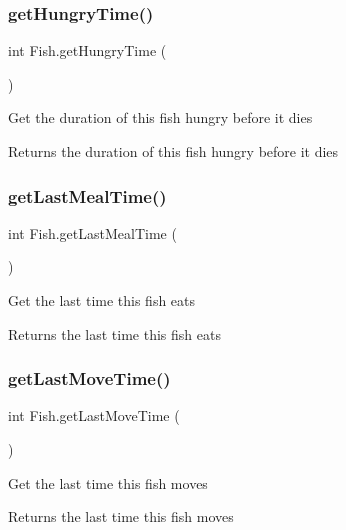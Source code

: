 \subsubsection{\texorpdfstring{get\+Hungry\+Time()}{getHungryTime()}}
{\footnotesize\ttfamily int Fish.\+get\+Hungry\+Time (\begin{DoxyParamCaption}{ }\end{DoxyParamCaption})\hspace{0.3cm}{\ttfamily [inline]}}

Get the duration of this fish hungry before it dies \begin{DoxyReturn}{Returns}
the duration of this fish hungry before it dies 
\end{DoxyReturn}
\mbox{\label{class_fish_a84aaee65d812cd3f8357c9173ec13b75}} 
\subsubsection{\texorpdfstring{get\+Last\+Meal\+Time()}{getLastMealTime()}}
{\footnotesize\ttfamily int Fish.\+get\+Last\+Meal\+Time (\begin{DoxyParamCaption}{ }\end{DoxyParamCaption})\hspace{0.3cm}{\ttfamily [inline]}}

Get the last time this fish eats \begin{DoxyReturn}{Returns}
the last time this fish eats 
\end{DoxyReturn}
\mbox{\label{class_fish_a57dcae78fad400c6b8e09f1443acf491}} 
\subsubsection{\texorpdfstring{get\+Last\+Move\+Time()}{getLastMoveTime()}}
{\footnotesize\ttfamily int Fish.\+get\+Last\+Move\+Time (\begin{DoxyParamCaption}{ }\end{DoxyParamCaption})\hspace{0.3cm}{\ttfamily [inline]}}

Get the last time this fish moves \begin{DoxyReturn}{Returns}
the last time this fish moves 
\end{DoxyReturn}
\mbox{\label{class_fish_af967adfd2d8b4486175131509fcf541b}} 
